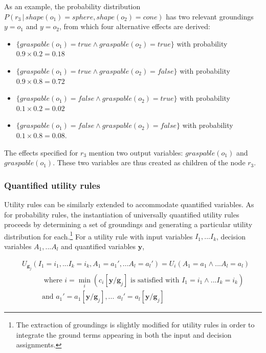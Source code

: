 As an example, the probability distribution $P(r_3 \, | \, \mathit{shape}(o_1)\!=\!\mathit{sphere}, \mathit{shape}(o_2)\!=\!\mathit{cone})$ has two relevant groundings $y\!=\!o_1$ and $y\!=\!o_2$, from which four alternative effects are derived: \begin{itemize}
\item $\{\mathit{graspable}(o_1)\!=\!true \land \mathit{graspable}(o_2)\!=\!true \} $ with probability $0.9 \times 0.2 = 0.18$ 
\item $\{\mathit{graspable}(o_1)\!=\!true \land \mathit{graspable}(o_2)\!=\!false\}$ with probability $0.9 \times 0.8 = 0.72$ 
\item $\{\mathit{graspable}(o_1)\!=\!false \land \mathit{graspable}(o_2)\!=\!true \}$ with probability $0.1 \times 0.2 = 0.02$ 
\item $\{\mathit{graspable}(o_1)\!=\!false \land \mathit{graspable}(o_2)\!=\!false\}$ with probability $0.1 \times 0.8 = 0.08$. 
\end{itemize} 

The effects specified for $r_3$ mention two output variables: $\mathit{graspable}(o_1)$ and $\mathit{graspable}(o_1)$.  These two variables are thus created as children of the node $r_3$. 

\subsubsection*{Quantified utility rules}

Utility rules can be similarly extended to accommodate quantified variables. As for probability rules, the instantiation of universally quantified utility rules proceeds by determining a set of groundings and generating a particular utility distribution for each.\footnote{The extraction of groundings is slightly modified for utility rules in order to integrate the ground terms appearing in both the input and decision assignments.}
 For a utility rule with input variables $I_1,...I_k$, decision variables $A_1,...A_l$ and quantified variables $\mathbf{y}$,
 
 \begin{align}
& U_{\mathbf{g}_j}(I_1\!=\!i_1,... I_k\!=\!i_k, A_1\!=\!a_1',... A_l\!=\!a_l') = U_i(A_1\!=\!a_1 \land... A_l\!=\!a_l) 
 \\
& \; \; \; \; \; \; \; \;   \; \; \;\text{where } i = \min_i (c_i[\mathbf{y} / \mathbf{g}_j]\text{ is satisfied with } I_1\!=\!i_1 \land ... I_k\!=\!i_k) \nonumber \\
& \; \; \; \; \; \; \; \;   \; \;  \text{and } a_1' = a_1[\mathbf{y} / \mathbf{g}_j], ... \ \ a_l' = a_l[\mathbf{y} / \mathbf{g}_j] \nonumber
\end{align}

